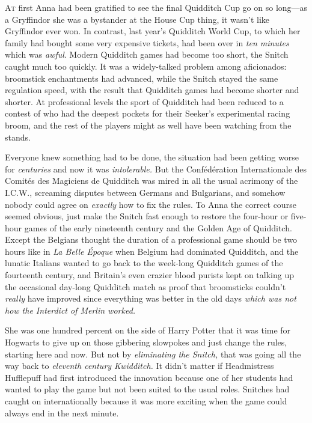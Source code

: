 
\lettrine{A}{t} first Anna had
been gratified to see the final Quidditch Cup go on so long---as a Gryffindor
she was a bystander at the House Cup thing, it wasn't like Gryffindor ever won.
In contrast, last year's Quidditch World Cup, to which her family had bought
some very expensive tickets, had been over in \emph{ten minutes} which was
\emph{awful}. Modern Quidditch games had become too short, the Snitch caught
much too quickly. It was a widely-talked problem among aficionados: broomstick
enchantments had advanced, while the Snitch stayed the same regulation speed,
with the result that Quidditch games had become shorter and shorter. At
professional levels the sport of Quidditch had been reduced to a contest of who
had the deepest pockets for their Seeker's experimental racing broom, and the
rest of the players might as well have been watching from the stands.

Everyone knew something had to be done, the situation had been getting worse
for \emph{centuries} and now it was \emph{intolerable.} But the Confédération
Internationale des Comités des Magiciens de Quidditch was mired in all the usual
acrimony of the I.C.W., screaming disputes between Germans and Bulgarians, and
somehow nobody could agree on \emph{exactly} how to fix the rules. To Anna the
correct course seemed obvious, just make the Snitch fast enough to restore the
four-hour or five-hour games of the early nineteenth century and the Golden Age
of Quidditch. Except the Belgians thought the duration of a professional game
should be two hours like in \emph{La Belle Époque} when Belgium had dominated
Quidditch, and the lunatic Italians wanted to go back to the week-long
Quidditch games of the fourteenth century, and Britain's even crazier blood
purists kept on talking up the occasional day-long Quidditch match as proof
that broomsticks couldn't \emph{really} have improved since everything was
better in the old days \emph{which was not how the Interdict of Merlin worked.}

She was one hundred percent on the side of Harry Potter that it was time for
Hogwarts to give up on those gibbering slowpokes and just change the rules,
starting here and now. But not by \emph{eliminating the Snitch,} that was going
all the way back to \emph{eleventh century Kwidditch.} It didn't matter if
Headmistress Hufflepuff had first introduced the innovation because one of her
students had wanted to play the game but not been suited to the usual roles.
Snitches had caught on internationally because it was more exciting when the
game could always end in the next minute.

